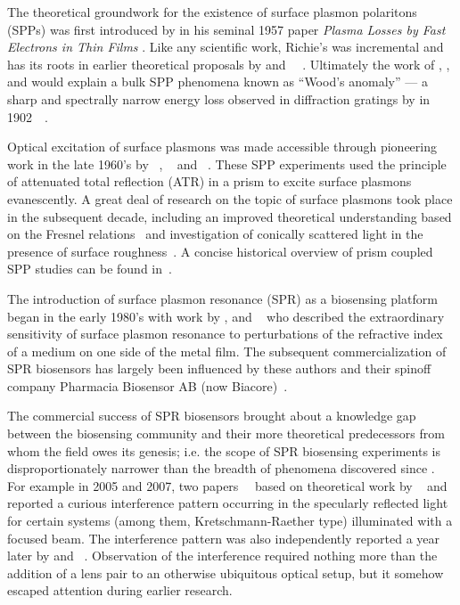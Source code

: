 The theoretical groundwork for the existence of surface plasmon polaritons
(SPPs) was first introduced by  in his seminal 1957 paper
\textit{Plasma Losses by Fast Electrons in Thin Films}
\cite{ritchie1957plasma}.  Like any scientific work, Richie's was
incremental and has its roots in earlier theoretical proposals by
 and
~\cite{bohm1951collective}~\cite{pines1952collective}.
Ultimately the work of , , and  would
explain a bulk SPP phenomena known as ``Wood's anomaly'' --- a sharp and
spectrally narrow energy loss observed in diffraction gratings by
 in
1902~\cite{wood1902remarkable}~\cite{rayleigh1907remarkable}.

Optical excitation of surface plasmons was made accessible through
pioneering work in the late 1960's by
~\cite{kretschmann1968},
~\cite{raether1988springer} and
~\cite{otto1968excitation}.  These SPP experiments used the
principle of attenuated total reflection (ATR) in a prism to excite surface
plasmons evanescently.  A great deal of research on the topic of surface
plasmons took place in the subsequent decade, including an improved
theoretical understanding based on the Fresnel
relations~\cite{chen1976excitation} and investigation of conically scattered
light in the presence of surface roughness~\cite{simon1976directional}.  A
concise historical overview of prism coupled SPP studies can be found
in~\cite{raether1997surface}.

The introduction of surface plasmon resonance (SPR) as a biosensing platform
began in the early 1980's with work by ,  and
~\cite{liedberg1983surface} who described the extraordinary
sensitivity of surface plasmon resonance to perturbations of the refractive
index of a medium on one side of the metal film.  The subsequent
commercialization of SPR biosensors has largely been influenced by these
authors and their spinoff company Pharmacia Biosensor AB (now
Biacore)~\cite{liedberg1995biosensing}.

The commercial success of SPR biosensors brought about a knowledge gap between
the biosensing community and their more theoretical predecessors from whom the
field owes its genesis; i.e\@. the scope of SPR biosensing experiments is
disproportionately narrower than the breadth of phenomena discovered since
.  For example in 2005 and 2007, two
papers~\cite{andaloro2005optical}~\cite{simon2007observation} based on
theoretical work by ~\cite{chuang1986lateral} and 
\cite{chen1976excitation} reported a curious interference pattern occurring in
the specularly reflected light for certain systems (among them,
Kretschmann-Raether type) illuminated with a focused beam.  The interference
pattern was also independently reported a year later by  and
~\cite{schumann2008near}.  Observation of the interference
required nothing more than the addition of a lens pair to an otherwise
ubiquitous optical setup, but it somehow escaped attention during earlier
research.

